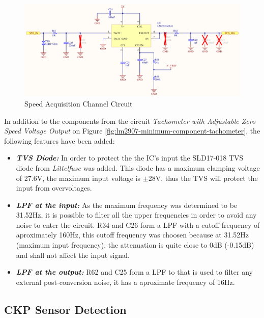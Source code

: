 			\begin{figure}[htbp]
				\centering
					\includegraphics[scale=0.5]{figuras/fig-ckp-conditioning-circuit.png}
				\caption{Speed Acquisition Channel Circuit \cite{ckp-conditioning-circuit}}
				\label{fig:ckp-conditioning-circuit}
			\end{figure}

			In addition to the components from the circuit \textit{Tachometer with Adjustable Zero Speed Voltage Output} on Figure \ref{fig:lm2907-minimum-component-tachometer}, the following features have been added:

			\begin{itemize}
				\item\textit{\textbf{TVS Diode:}} In order to protect the the IC's input the SLD17-018 TVS diode from \textit{Littelfuse} was added. This diode has a maximum clamping voltage of 27.6V, the maximum input voltage is $\pm$28V, thus the TVS will protect the input from overvoltages.\label{itm:ckp-circuit-tvs}
				\item\textit{\textbf{LPF at the input:}} As the maximum frequency was determined to be 31.52Hz, it is possible to filter all the upper frequencies in order to avoid any noise to enter the circuit. R34 and C26 form a LPF with a cutoff frequency of aproximately 160Hz, this cutoff frequency was choosen because at 31.52Hz (maximum input frequency), the attenuation is quite close to 0dB (-0.15dB) and shall not affect the input signal.\label{itm:ckp-circuit-lpf-input}
				\item\textit{\textbf{LPF at the output:}} R62 and C25 form a LPF to that is used to filter any external post-conversion noise, it has a aproximate frequency of 16Hz.\label{itm:ckp-circuit-lpf-output} 
			\end{itemize}


	\subsection{CKP Sensor Detection}\label{ssec:ckp-sensor-detection-circuit}


